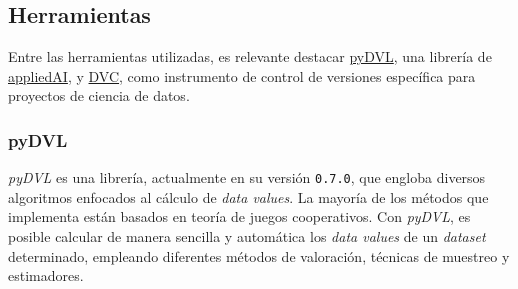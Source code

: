 \begin{table}[ht]
    \centering
    \caption{Datasets usados en los experimentos}
    \label{tab:datasets}
\end{table}


\subsection{Herramientas}

Entre las herramientas utilizadas, es relevante
destacar \href{https://aai-institute.github.io/pyDVL/0.7.0/}{pyDVL},
una librería de \href{https://www.appliedai.de/en/}{appliedAI}, y
\href{https://dvc.org/}{DVC}, como instrumento de control de
versiones específica para proyectos de ciencia de datos.

\subsubsection*{pyDVL}

\textit{pyDVL} es una librería, actualmente en su versión
\texttt{0.7.0}, que engloba diversos algoritmos enfocados al cálculo
de \textit{data values}. La mayoría de los métodos que implementa
están basados en teoría de juegos cooperativos.
Con \textit{pyDVL}, es posible calcular de manera sencilla y
automática los \textit{data values} de un \textit{dataset}
determinado, empleando diferentes métodos de
valoración, técnicas de muestreo y estimadores. 

